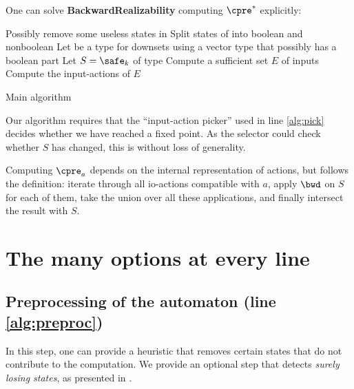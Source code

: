 \documentclass[runningheads,a4paper,draft]{llncs}
\begin{document}
One can
solve \textbf{BackwardRealizability} computing
\(\cpre^*\) explicitly:
\begin{algorithm}
  \LinesNumbered
{}

\BlankLine

Possibly remove some useless states in \cA\;\label{alg:preproc}
Split states of \cA into boolean and nonboolean\;\label{alg:bool}
Let \Downset be a type for downsets using a vector type that possibly has a
boolean part\;\label{alg:types}
Let \(S = \safe_k\) of type \Downset\;
Compute a sufficient set \(E\) of  inputs\;\label{alg:inputs}
Compute the input-actions of \(E\)\;\label{alg:actions}
\caption{Main algorithm}\label{main_algo}
\end{algorithm}

Our algorithm requires that the ``input-action picker'' used in line \ref{alg:pick}
decides whether we have reached a fixed point.  As the selector could check
whether \(S\) has changed, this is without loss of generality.

Computing \(\cpre_a\) depends on the internal representation of actions, but
follows the definition:
iterate through all %
io-actions
compatible with \(a\), %
apply \(\bwd\) on \(S\) for each of them, take the union
over all these applications, and finally intersect the result with \(S\).

\section{The many options at every line}\label{sec:implem}

\subsection{Preprocessing of the automaton (line \ref{alg:preproc})}

In this step, one can provide a heuristic that removes certain states that
do not contribute to the computation.  We provide an optional step that
detects \emph{surely losing states}, as presented in \cite{ggs14}.
\end{document}
